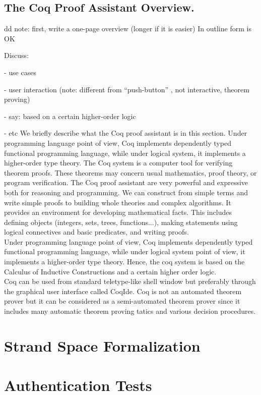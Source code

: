\section{The Coq Proof Assistant Overview.}
dd note:  first, write a one-page overview (longer if it is easier)
In outline form is OK

Discuss:

 - use cases

 - user interaction (note: different from ``push-button'' , not
 interactive, theorem proving)

 - say: based on a certain higher-order logic

 - etc
We briefly describe what the Coq proof assistant is in this section.
Under programming language point of view, Coq implements dependently typed functional programming language, while under logical system, it implements a higher-order type theory.
The Coq system is a computer tool for verifying theorem proofs. These theorems may concern usual mathematics, proof theory, or program verification. The Coq proof assistant are very powerful and expressive both for reasoning and programming. We can construct from simple terms and write simple proofs to building whole theories and complex algorithms. It provides an environment for developing mathematical facts. This includes defining objects (integers, sets, trees, functions...), making statements using logical connectives and basic predicates, and writing proofs.\\
Under programming language point of view, Coq implements dependently typed functional programming language, while under logical system point of view, it implements a higher-order type theory. Hence, the coq system is based on the Calculus of Inductive Constructions and a certain higher order logic.\\
Coq can be used from standard teletype-like shell window but preferably through the graphical user interface called CoqIde. Coq is not an automated theorem prover but it can be considered as a semi-automated theorem prover since it includes many automatic theorem proving tatics and various decision procedures. 
 
 


\chapter{Strand Space Formalization}


\chapter{Authentication Tests}

